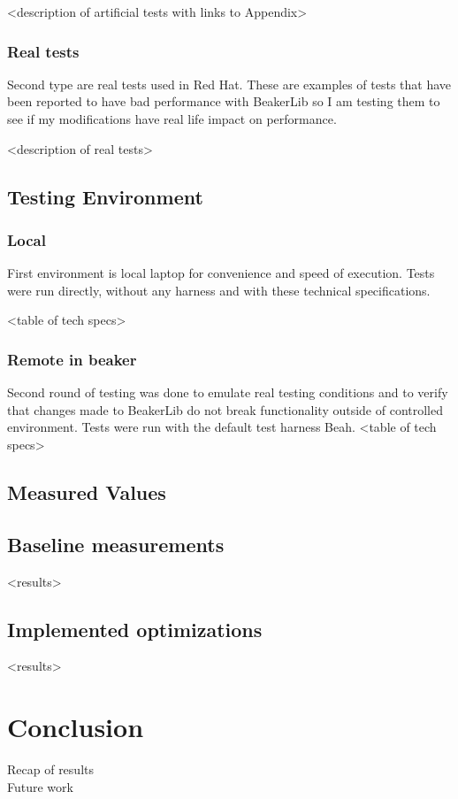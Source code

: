 <description of artificial tests with links to Appendix>

\subsection{Real tests}
Second type are real tests used in Red Hat. These are examples of tests that have been reported to have bad performance with BeakerLib so I am testing them to see if my modifications have real life impact on performance.

<description of real tests>

\section{Testing Environment}

\subsection{Local}
First environment is local laptop for convenience and speed of execution. Tests were run directly, without any harness and with these technical specifications. 

<table of tech specs>

\subsection{Remote in beaker}
Second round of testing was done to emulate real testing conditions and to verify that changes made to BeakerLib do not break functionality outside of controlled environment. Tests were run with the default test harness Beah.
<table of tech specs>

\section{Measured Values}

\section{Baseline measurements}
<results>


\section{Implemented optimizations}
<results>

\chapter{Conclusion}
Recap of results
\\
Future work


